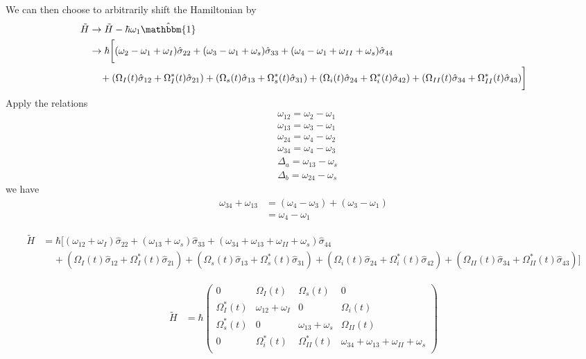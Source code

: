 \documentclass[aps,pra,showpacs,amsmath,amssymb,nofootinbib,longbibliography,superscriptaddress
]{revtex4-1}
\theoremstyle{definition}
\theoremstyle{remark}
\newcommand{\0}{\hat{0}}
\begin{document}
We can then choose to arbitrarily shift the Hamiltonian by
\begin{align}
    \tilde{H} &\rightarrow \tilde{H} - \hbar \omega_1 \hat{\mathbbm{1}} \nonumber \\
    &\rightarrow \hbar \biggl[(\omega_2 - \omega_1 + \omega_I) \hat{\sigma}_{22} + (\omega_3 - \omega_1 + \omega_s) \hat{\sigma}_{33} + (\omega_4 - \omega_1 + \omega_{II} + \omega_s) \hat{\sigma}_{44} \nonumber \\
    &\;\;\;\;+ \left(\Omega_{I}(t) \hat{\sigma}_{12} + \Omega_{I}^*(t) \hat{\sigma}_{21} \right)+ \left(\Omega_{s}(t) \hat{\sigma}_{13} + \Omega_{s}^*(t) \hat{\sigma}_{31} \right) + ( \Omega_{i}(t) \hat{\sigma}_{24} + \Omega_{i}^*(t) \hat{\sigma}_{42} ) + (\Omega_{II}(t) \hat{\sigma}_{34} + \Omega_{II}^*(t) \hat{\sigma}_{43} ) \biggr] \nonumber
\end{align}
Apply the relations
\begin{align}
    &\omega_{12} = \omega_2 - \omega_1\\
    &\omega_{13} = \omega_3 - \omega_1\\
    &\omega_{24} = \omega_4 - \omega_2\\
    &\omega_{34} = \omega_4 - \omega_3\\
    &\Delta_a = \omega_{13} - \omega_s\\
    &\Delta_b = \omega_{24} - \omega_s
\end{align}
we have
\begin{align}
    \omega_{34} + \omega_{13} &= (\omega_4 - \omega_3) + (\omega_3 - \omega_1)\nonumber \\
    &= \omega_4 - \omega_1
\end{align}

\begin{align}
    \tilde{H} &= \hbar \biggl[(\omega_{12}+ \omega_I) \hat{\sigma}_{22} + (\omega_{13} + \omega_s) \hat{\sigma}_{33} + (\omega_{34} + \omega_{13} + \omega_{II} + \omega_s) \hat{\sigma}_{44} \nonumber \\
    &\;\;\;\;+ \left(\Omega_{I}(t) \hat{\sigma}_{12} + \Omega_{I}^*(t) \hat{\sigma}_{21} \right) + \left(\Omega_{s}(t) \hat{\sigma}_{13} + \Omega_{s}^*(t)\hat{\sigma}_{31} \right) + ( \Omega_{i}(t) \hat{\sigma}_{24} + \Omega_{i}^*(t) \hat{\sigma}_{42} ) + (\Omega_{II}(t) \hat{\sigma}_{34} + \Omega_{II}^*(t) \hat{\sigma}_{43} )\biggr]
\end{align}


\begin{align}
    \tilde{H} &= \hbar \left(\begin{array}{cccc}
        0 & \Omega_{I}(t) & \Omega_{s}(t) & 0\\
        \Omega_{I}^*(t) & \omega_{12} + \omega_I & 0 & \Omega_{i}(t) \\
        \Omega_{s}^*(t) & 0 & \omega_{13} + \omega_s & \Omega_{II}(t)\\
        0 & \Omega_{i}^*(t) & \Omega_{II}^*(t) & \omega_{34} + \omega_{13} + \omega_{II} + \omega_s\\
    \end{array}\right)
\end{align}







\end{document}
